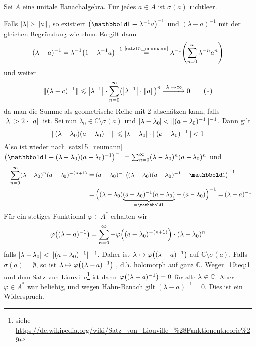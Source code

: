 \begin{satz}[{name=[In unitalen Banachalgebren sind die Spektren nie leer]},label=spec_nichtleer]
	Sei $A$ eine unitale Banachalgebra. Für jedes $a \in A$ ist $\sigma(a)$ nichtleer. 
\end{satz}
\begin{beweis}
	Falls $\lvert\lambda\rvert> \Vert a\Vert$, so existiert $\enbrace*{\ind- \lambda^{-1} a}^{-1}$ und $(\lambda-a)^{-1}$ mit der gleichen Begründung wie eben. Es gilt dann
	\begin{align}
		(\lambda-a)^{-1} = \lambda^{-1} \enbrace*{1- \lambda^{-1} a}^{-1} \stackrel{\mbox{\scriptsize\ref{satz15_neumann}}}{=} \lambda^{-1} \enbrace*{\sum_{n=0}^{\infty} 
		\lambda^{-n}a^n}
	\end{align}
	und weiter
	\[
		\norm{(\lambda-a)^{-1}} \le \abs*{\lambda^{-1}} \cdot \sum_{n=0}^{\infty} \enbrace*{\abs*{\lambda^{-1}} \cdot \norm{a}}^n  \xrightarrow{\abs{\lambda} \to \infty} 0 
		\label{19:eq:1} \tag{$*$}
	\]
	da man die Summe als geometrische Reihe mit $2$ abschätzen kann, falls $\lvert\lambda\rvert> 2 \cdot \Vert a\Vert$ ist.
	Sei nun $\lambda_0 \in \mathbb{C}\setminus \sigma(a)$ und $\lvert\lambda-\lambda_0\rvert< \Vert(a- \lambda_0)^{-1}\Vert^{-1}$. Dann gilt 
	\[
		\Vert(\lambda-\lambda_0)(a - \lambda_0)^{-1}\Vert \leqslant \lvert\lambda-\lambda_0\rvert \cdot \Vert(a-\lambda_0)^{-1}\Vert <1   
	\]
	Also ist wieder nach \autoref{satz15_neumann} $\enbrace*{\ind- (\lambda-\lambda_0)(a-\lambda_0)^{-1}}^{-1} = \sum_{n=0}^{\infty} (\lambda-\lambda_0)^n (a-\lambda_0)^n$ und 
	\begin{align}
		-\sum_{n=0}^{\infty} (\lambda-\lambda_0)^n(a-\lambda_0)^{-(n+1)} &= (a- \lambda_0)^{-1} \enbrace*{(\lambda-\lambda_0)(a-\lambda_0)^{-1}-\ind}^{-1} \\
		&= \enbrace[\Big]{(\lambda-\lambda_0) \Underbrace{(a-\lambda_0)^{-1}(a-\lambda_0)}{=\ind}-(a- \lambda_0)}^{-1} = (\lambda-a)^{-1}
	\end{align}
	Für ein stetiges Funktional $\varphi \in A^*$ erhalten wir 
	\[
		\varphi\enbrace*{(\lambda-a)^{-1}} = \sum_{n=0}^{\infty} - \varphi \enbrace*{(a-\lambda_0)^{-(n+1)}} \cdot (\lambda-\lambda_0)^n
	\]
	falls $\lvert\lambda-\lambda_0\rvert < \Vert(a- \lambda_0)^{-1}\Vert^{-1}$. Daher ist $\lambda \mapsto \varphi \enbrace*{(\lambda-a)^{-1}}$  auf 
	$\mathbb{C}\setminus \sigma(a)$. Falls $\sigma(a)= \emptyset$, so ist $\lambda \mapsto \varphi \enbrace*{(\lambda-a)^{-1}}$ , d.h. holomorph 
	auf ganz $\mathbb{C}$. Wegen \eqref{19:eq:1} und dem Satz von Liouville\footnote{siehe \url{https://de.wikipedia.org/wiki/Satz_von_Liouville_\%28Funktionentheorie\%29}} ist 
	dann $\varphi \enbrace*{(\lambda-a)^{-1}}=0$ für alle $\lambda\in \mathbb{C}$. Aber $\varphi \in A^*$ war beliebig, und wegen Hahn-Banach gilt $(\lambda-a)^{-1}=0$. Dies 
	ist ein Widerspruch. 
\end{beweis}

